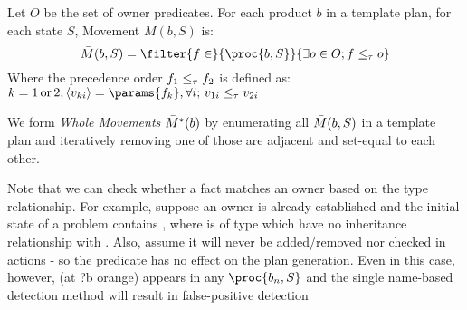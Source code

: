 \begin{defi}[Movement]

Let $O$ be the set of owner predicates.
For each product $b$ in a template plan, for each state $S$,
Movement $\bar{M}(b,S)$ is:
\[
\movement(b,S) = \filter{f\in}{\proc{b,S}}{\exists o \in O; f\subtype o}
\]
Where the precedence order $f_1\leq_\tau f_2$ is defined as:
$k=1 \,\mbox{or}\, 2, \left< v_{ki} \right> = \params{f_k}, \forall i; \, v_{1i} \subtype v_{2i}$
\end{defi}
\begin{defi}
We form {\em Whole Movements} $\bar{M}^*(b)$
by enumerating all $\bar{M}(b,S)$ in a template plan
and iteratively removing one of those are adjacent and set-equal to each other.
\end{defi}

Note that we can check whether a fact matches an owner based on the type relationship.
For example, suppose an owner  is already established
and the initial state of a problem contains , 
where  is of type  which have no inheritance relationship with .
Also, assume it will never be added/removed nor checked in actions
 - so the predicate has no effect on the plan generation.
Even in this case, however, (at ?b orange) appears in any $\proc{b_n,S}$
and the single name-based detection method will result in false-positive detection



